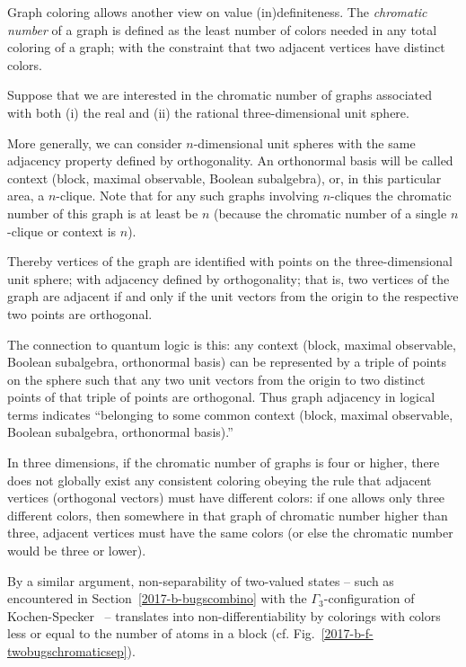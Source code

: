 Graph coloring allows another view on value (in)definiteness.
The {\em chromatic number} of a graph
is defined as the least number of colors needed in any total coloring of a graph;
with the constraint that two adjacent vertices have distinct colors.

Suppose that we are interested in the chromatic number of graphs associated with
both (i) the real and (ii) the rational three-dimensional unit sphere.

More generally, we can consider $n$-dimensional unit spheres with the same adjacency property defined by orthogonality.
An orthonormal basis will be called context (block, maximal observable, Boolean subalgebra),
or, in this particular area, a $n$-clique.
Note that for any such graphs involving $n$-cliques the chromatic number of this graph is at least be $n$
(because the chromatic number of a single $n$-clique or context is $n$).

Thereby vertices of the graph are identified with points on the three-dimensional unit sphere;
with adjacency  defined by orthogonality; that is,
two vertices of the graph are adjacent if and only if the unit vectors from the origin
to the respective two points are orthogonal.

The connection to quantum logic is this: any context
(block, maximal observable, Boolean subalgebra, orthonormal basis)
can be represented by a triple of points on the sphere
such that any two unit vectors from the origin
to two distinct points of that triple of points are orthogonal.
Thus graph adjacency in logical terms indicates
``belonging to some common context (block, maximal observable, Boolean subalgebra, orthonormal basis).''

In three dimensions, if the chromatic number of  graphs is four or higher,
there does not globally exist any consistent
coloring obeying the rule that adjacent vertices (orthogonal vectors)
must have different colors: if one allows only three different colors,
then somewhere in that graph of chromatic number higher than three, adjacent vertices must have the same colors
(or else the chromatic number would be three or lower).


By a similar argument, non-separability of two-valued states
--
such as encountered in Section~\ref{2017-b-bugscombino}
with the $\Gamma_3$-configuration of Kochen-Specker~\cite[p.~70]{kochen1}
-- translates into non-differentiability by colorings
with colors less or equal to the number of atoms in a block
(cf. Fig.~\ref{2017-b-f-twobugschromaticsep}).

